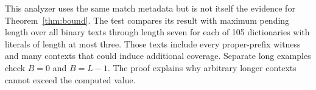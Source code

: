 \documentclass[11pt,a4paper]{article}
\begin{document}
This analyzer uses the same match metadata but is not itself the evidence for Theorem~\ref{thm:bound}. The test compares its result with maximum pending length over all binary texts through length seven for each of 105 dictionaries with literals of length at most three. Those texts include every proper-prefix witness and many contexts that could induce additional coverage. Separate long examples check $B=0$ and $B=L-1$. The proof explains why arbitrary longer contexts cannot exceed the computed value.
\end{document}
